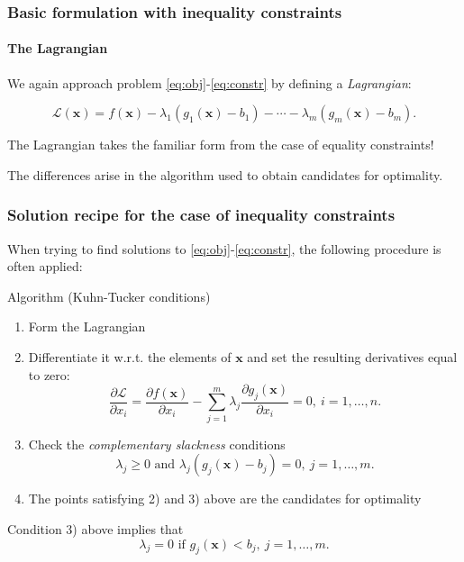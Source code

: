 \documentclass[10pt]{beamer}
\theoremstyle{definition}
\begin{document}
\begin{frame}[fragile]
\frametitle{Basic formulation with inequality constraints}
\framesubtitle{The Lagrangian}
We again approach problem \eqref{eq:obj}-\eqref{eq:constr} by defining a \emph{Lagrangian}:

\[ \mathcal{L}(\mathbf{x}) = f(\mathbf{x}) - \lambda_1 (g_1(\mathbf{x})-b_1) - \cdots - \lambda_m (g_m(\mathbf{x})-b_m). \]\bigskip

The Lagrangian takes the familiar form from the case of equality constraints! \bigskip

The differences arise in the algorithm used to obtain candidates for optimality.
\end{frame}

\begin{frame}[fragile]
\frametitle{Solution recipe for the case of inequality constraints}
When trying to find solutions to \eqref{eq:obj}-\eqref{eq:constr}, the following procedure is often applied:

\begin{block}{Algorithm (Kuhn-Tucker conditions)}
\begin{enumerate}
\item Form the Lagrangian
\item Differentiate it w.r.t. the elements of $ \mathbf{x} $ and set the resulting derivatives equal to zero:
\begin{equation}
\dfrac{\partial \mathcal{L}}{\partial x_i} = \dfrac{\partial f(\mathbf{x})}{\partial x_i} - \sum_{j=1}^{m}\lambda_j \dfrac{\partial g_j(\mathbf{x})}{\partial x_i} = 0,~i=1,\ldots,n.
\label{eq:dLdX}
\end{equation}
\item Check the \emph{complementary slackness} conditions \begin{equation}
\lambda_j \geq 0 \text{ and } \lambda_j (g_j(\mathbf{x})-b_j) = 0,~j=1,\ldots,m.
\label{eq:ComplSlack}
\end{equation}
\item The points satisfying 2) and 3) above are the candidates for optimality
\end{enumerate}
\end{block}

Condition 3) above implies that \[ \lambda_j = 0 \text{ if } g_j(\mathbf{x})<b_j,~j=1,\ldots,m. \]
\end{frame}
\end{document}
